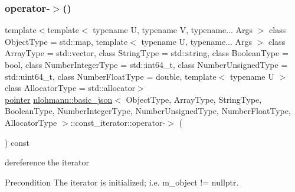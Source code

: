 \subsubsection{\texorpdfstring{operator-\/$>$()}{operator->()}}
{\footnotesize\ttfamily template$<$template$<$ typename U, typename V, typename... Args $>$ class Object\+Type = std\+::map, template$<$ typename U, typename... Args $>$ class Array\+Type = std\+::vector, class String\+Type  = std\+::string, class Boolean\+Type  = bool, class Number\+Integer\+Type  = std\+::int64\+\_\+t, class Number\+Unsigned\+Type  = std\+::uint64\+\_\+t, class Number\+Float\+Type  = double, template$<$ typename U $>$ class Allocator\+Type = std\+::allocator$>$ \\
\hyperlink{classnlohmann_1_1basic__json_1_1const__iterator_a1da96fc3054d547e7706d3a2f073f389}{pointer} \hyperlink{classnlohmann_1_1basic__json}{nlohmann\+::basic\+\_\+json}$<$ Object\+Type, Array\+Type, String\+Type, Boolean\+Type, Number\+Integer\+Type, Number\+Unsigned\+Type, Number\+Float\+Type, Allocator\+Type $>$\+::const\+\_\+iterator\+::operator-\/$>$ (\begin{DoxyParamCaption}{ }\end{DoxyParamCaption}) const\hspace{0.3cm}{\ttfamily [inline]}}



dereference the iterator 

\begin{DoxyPrecond}{Precondition}
The iterator is initialized; i.\+e. {\ttfamily m\+\_\+object != nullptr}. 
\end{DoxyPrecond}
\hypertarget{classnlohmann_1_1basic__json_1_1const__iterator_ae0f996eef6a970b2e654c4f6d33d6f9a}{}\label{classnlohmann_1_1basic__json_1_1const__iterator_ae0f996eef6a970b2e654c4f6d33d6f9a} 
